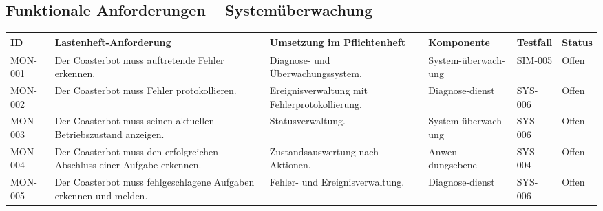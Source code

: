 \documentclass[
  a4paper,
  12pt,
  DIV=12,        %
  parskip=half,  %
  headings=small %
]{scrartcl}
\theoremstyle{definition}
\theoremstyle{definition}
\begin{document}
\subsection{Funktionale Anforderungen --
Systemüberwachung}\label{funktionale-anforderungen-systemuxfcberwachung}

\begin{longtable}[]{@{}
  >{\raggedright\arraybackslash}p{}
  >{\raggedright\arraybackslash}p{}
  >{\raggedright\arraybackslash}p{}
  >{\raggedright\arraybackslash}p{}
  >{\raggedleft\arraybackslash}p{}
  >{\raggedright\arraybackslash}p{}@{}}
\toprule\noalign{}
\begin{minipage}[b]{\linewidth}\raggedright
ID
\end{minipage} & \begin{minipage}[b]{\linewidth}\raggedright
Lastenheft-Anforderung
\end{minipage} & \begin{minipage}[b]{\linewidth}\raggedright
Umsetzung im Pflichtenheft
\end{minipage} & \begin{minipage}[b]{\linewidth}\raggedright
Komponente
\end{minipage} & \begin{minipage}[b]{\linewidth}\raggedleft
Testfall
\end{minipage} & \begin{minipage}[b]{\linewidth}\raggedright
Status
\end{minipage} \\
\midrule\noalign{}
\endhead
\bottomrule\noalign{}
\endlastfoot
MON-001 & Der Coasterbot muss auftretende Fehler erkennen. & Diagnose-
und Überwachungssystem. & System-überwach-ung & SIM-005 & Offen \\
MON-002 & Der Coasterbot muss Fehler protokollieren. &
Ereignisverwaltung mit Fehlerprotokollierung. & Diagnose-dienst &
SYS-006 & Offen \\
MON-003 & Der Coasterbot muss seinen aktuellen Betriebszustand anzeigen.
& Statusverwaltung. & System-überwach-ung & SYS-006 & Offen \\
MON-004 & Der Coasterbot muss den erfolgreichen Abschluss einer Aufgabe
erkennen. & Zustandsauswertung nach Aktionen. & Anwen-dungsebene &
SYS-004 & Offen \\
MON-005 & Der Coasterbot muss fehlgeschlagene Aufgaben erkennen und
melden. & Fehler- und Ereignisverwaltung. & Diagnose-dienst & SYS-006 &
Offen \\
\end{longtable}
\end{document}
